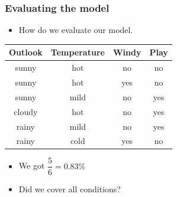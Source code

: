 \documentclass{beamer}
\begin{document}
\begin{frame}[t]
  \frametitle{Evaluating the model}
 \begin{itemize}
   \item How do we \alert{evaluate} our model.
 \end{itemize} 

\begin{center}
\begin{table}[]
  \centering
  \begin{tabular}{cccc}
    \toprule
    Outlook & Temperature & Windy & Play \\ 
    \midrule
    sunny   & hot         & no    & no   \\ 
    sunny   & hot         & yes   & no   \\ 
    sunny   & mild        & no    & yes  \\ 
    cloudy  & hot         & no    & yes  \\ 
    rainy   & mild        & no    & yes  \\ 
    rainy   & cold        & yes   & no   \\ 
    \bottomrule
  \end{tabular}
\end{table}
\end{center}

\pause
\begin{itemize}
  \item We got $\dfrac{5}{6}=0.83\%$\\\pause
  \item  Did we cover all conditions?
\end{itemize}
\end{frame}
\end{document}
